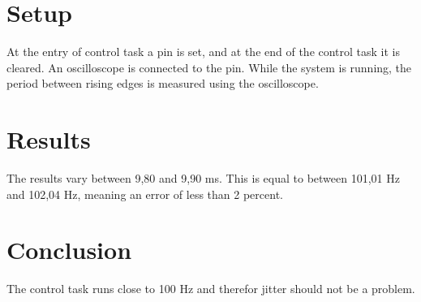 \section*{Setup}
At the entry of control task a pin is set, and at the end of the control task it
is cleared. An oscilloscope is connected to the pin. While the system is running, the period between rising edges is measured using the oscilloscope.

\section*{Results}
The results vary between 9,80 and 9,90 ms. This is equal to between 101,01 Hz and 102,04 Hz, meaning an error of less than 2 percent.

\section*{Conclusion}
The control task runs close to 100 Hz and therefor jitter should not be a problem.









